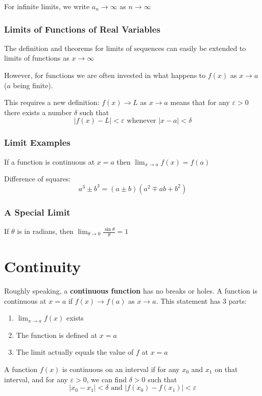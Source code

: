 \documentclass[12pt]{article}
\begin{document}
For infinite limits, we write $a_n \to\infty$ as $n \to\infty$

\subsubsection*{Limits of Functions of Real Variables}
The definition and theorems for limits of sequences can easily be extended to limits of functions as $x\to\infty$

However, for functions we are often invested in what happens to $f(x)$ as $x \to a$ ($a$ being finite).

This requires a new definition: $f(x) \to L$ as $x \to a$ means that for any $\varepsilon > 0$ there exists a number $\delta$ such that \[ |f(x) - L| < \varepsilon \text{ whenever } |x - a| < \delta \]

\subsubsection*{Limit Examples}
If a function is continuous at $x=a$ then $\displaystyle\lim_{x \to a}f(x) = f(a)$

Difference of squares:
\[ a^3 \pm b^3 = (a \pm b)(a^2 \mp ab + b^2) \]

\subsubsection*{A Special Limit}
If $\theta$ is in radians, then $\displaystyle\lim_{\theta\to 0}\frac{\sin\theta}{\theta} = 1$

\section*{Continuity}
Roughly speaking, a {\bf continuous function} has no breaks or holes. A function is continuous at $x=a$ if $f(x) \to f(a)$ as $x \to a$. This statement has 3 parts:
\begin{enumerate}
\item $\displaystyle\lim_{x\to a}f(x)$ exists
\item The function is defined at $x=a$
\item The limit actually equals the value of $f$ at $x=a$
\end{enumerate}

A function $f(x)$ is continuous on an interval if for any $x_0$ and $x_1$ on that interval, and for any $\varepsilon > 0$, we can find $\delta > 0$ such that \[ |x_0 - x_1| < \delta \text{ and } |f(x_0)-f(x_1)| < \varepsilon \]
\end{document}
